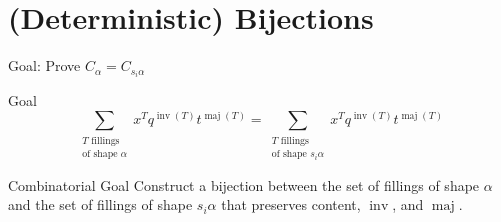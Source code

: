 \documentclass[aspectratio = 1609]{beamer}
\theoremstyle{definition}
\theoremstyle{plain} %
\DeclareMathOperator{\maj}{maj}
\DeclareMathOperator{\inv}{inv}
\begin{document}
\part{(Deterministic) Bijections}

\begin{frame}{Goal: Prove \(C_\alpha = C_{s_i \alpha}\)}
  \begin{block}{Goal}
    \[
      \sum_{\substack{T \text{ fillings} \\ \text{of shape } \alpha}}
      x^T q^{\inv(T)} t^{\maj(T)}
      =
      \sum_{\substack{T \text{ fillings} \\ \text{of shape } s_i \alpha}}
      x^T q^{\inv(T)} t^{\maj(T)}
    \]
  \end{block}

  \begin{block}{Combinatorial Goal}
    Construct a bijection between the set of fillings of shape \(\alpha\)
    and the set of fillings of shape \(s_i \alpha\) that preserves content, \(\inv\), and \(\maj\).
  \end{block}
\end{frame}
\end{document}
